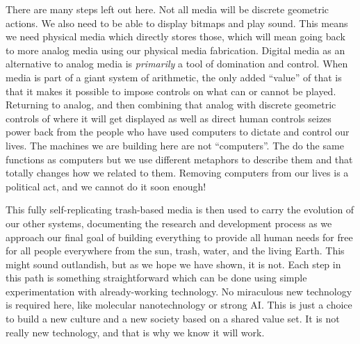 There are many steps left out here. Not all media will be discrete
geometric actions. We also need to be able to display bitmaps and play
sound. This means we need physical media which directly stores those,
which will mean going back to more analog media using our physical media
fabrication. Digital media as an alternative to analog media is
\emph{primarily} a tool of domination and control. When media is part of
a giant system of arithmetic, the only added ``value'' of that is that
it makes it possible to impose controls on what can or cannot be played.
Returning to analog, and then combining that analog with discrete
geometric controls of where it will get displayed as well as direct
human controls seizes power back from the people who have used computers
to dictate and control our lives. The machines we are building here are
not ``computers''. The do the same functions as computers but we use
different metaphors to describe them and that totally changes how we
related to them. Removing computers from our lives is a political act,
and we cannot do it soon enough!

This fully self-replicating trash-based media is then used to carry the
evolution of our other systems, documenting the research and development
process as we approach our final goal of building everything to provide
all human needs for free for all people everywhere from the sun, trash,
water, and the living Earth. This might sound outlandish, but as we hope
we have shown, it is not. Each step in this path is something
straightforward which can be done using simple experimentation with
already-working technology. No miraculous new technology is required
here, like molecular nanotechnology or strong AI. This is just a choice
to build a new culture and a new society based on a shared value set. It
is not really new technology, and that is why we know it will work.
